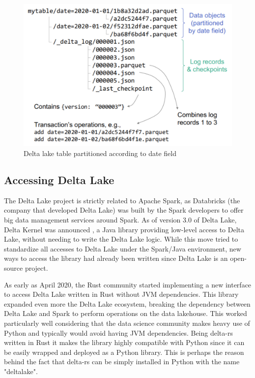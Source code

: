 \begin{figure}
    \begin{center}
      \includegraphics[width=\textwidth]{figures/2-background/delta_lake_table.png}
    \end{center}
    \caption{Delta lake table partitioned according to date field}
    \label{fig:delta_table}
\end{figure}

\subsection{Accessing Delta Lake}
\label{subsec:delta_lake_access}

The Delta Lake project is strictly related to Apache Spark, as Databricks (the company that developed Delta Lake) was built by the Spark developers \cite{zaharia2010spark} to offer big data management services around Spark. As of version 3.0 of Delta Lake, Delta Kernel was announced \cite{AnnouncingDeltaLake2023}, a Java library providing low-level access to Delta Lake, without needing to write the Delta Lake logic. While this move tried to standardize all accesses to Delta Lake under the Spark/Java environment, new ways to access the library had already been written since Delta Lake is an open-source project.

As early as April 2020, the Rust community started implementing a new interface to access Delta Lake written in Rust without \gls{JVM} dependencies. This library expanded even more the Delta Lake ecosystem, breaking the dependency between Delta Lake and Spark to perform operations on the data lakehouse. This worked particularly well considering that the data science community makes heavy use of Python and typically would avoid having \gls{JVM} dependencies. Being delta-rs written in Rust it makes the library highly compatible with Python since it can be easily wrapped and deployed as a Python library. This is perhaps the reason behind the fact that delta-rs can be simply installed in Python with the name "deltalake".
